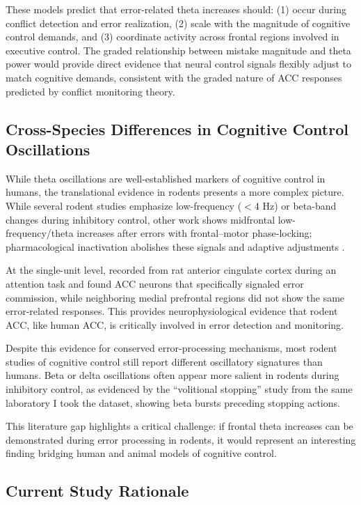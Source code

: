 \documentclass[11pt]{article}
\begin{document}
These models predict that error-related theta increases should: (1) occur during conflict detection and error realization, (2) scale with the magnitude of cognitive control demands, and (3) coordinate activity across frontal regions involved in executive control. The graded relationship between mistake magnitude and theta power would provide direct evidence that neural control signals flexibly adjust to match cognitive demands, consistent with the graded nature of ACC responses predicted by conflict monitoring theory.

\subsection{Cross-Species Differences in Cognitive Control Oscillations}

While theta oscillations are well-established markers of cognitive control in humans, the translational evidence in rodents presents a more complex picture. While several rodent studies emphasize low-frequency ($<$4 Hz) or beta-band changes during inhibitory control, other work shows midfrontal low-frequency/theta increases after errors with frontal–motor phase-locking; pharmacological inactivation abolishes these signals and adaptive adjustments \citep{narayanan2013common}.

At the single-unit level, \citet{totah2009anterior} recorded from rat anterior cingulate cortex during an attention task and found ACC neurons that specifically signaled error commission, while neighboring medial prefrontal regions did not show the same error-related responses. This provides neurophysiological evidence that rodent ACC, like human ACC, is critically involved in error detection and monitoring.

Despite this evidence for conserved error-processing mechanisms, most rodent studies of cognitive control still report different oscillatory signatures than humans. Beta or delta oscillations often appear more salient in rodents during inhibitory control, as evidenced by the ``volitional stopping'' study from the same laboratory I took the dataset, showing beta bursts preceding stopping actions.

This literature gap highlights a critical challenge: if frontal theta increases can be demonstrated during error processing in rodents, it would represent an interesting finding bridging human and animal models of cognitive control.

\subsection{Current Study Rationale}
\end{document}
